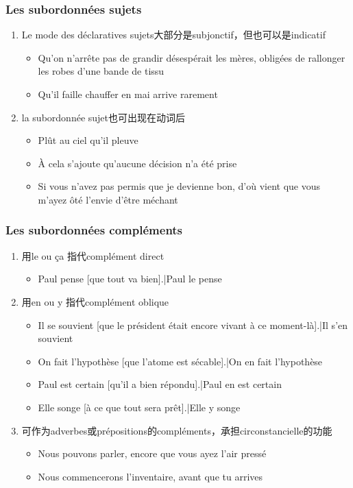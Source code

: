 \documentclass[UTF8]{report}
\begin{document}
\subsubsection{Les subordonnées sujets}
\begin{enumerate}
    \item Le mode des déclaratives sujets大部分是subjonctif，但也可以是indicatif
    \begin{itemize}
        \item Qu’on n’arrête pas de grandir désespérait les mères, obligées de rallonger les robes d’une bande de tissu
        \item Qu’il faille chauffer en mai arrive rarement
    \end{itemize}
    \item la subordonnée sujet也可出现在动词后
    \begin{itemize}
        \item Plût au ciel qu’il pleuve
        \item À cela s’ajoute qu’aucune décision n’a été prise
        \item Si vous n’avez pas permis que je devienne bon, d’où vient que vous m’ayez ôté l’envie d’être méchant
    \end{itemize}
\end{enumerate}

\subsubsection{Les subordonnées compléments}
\begin{enumerate}
    \item 用le ou ça 指代complément direct
    \begin{itemize}
        \item Paul pense [que tout va bien].|Paul le pense
    \end{itemize}
    \item 用en ou y 指代complément oblique
    \begin{itemize}
        \item Il se souvient [que le président était encore vivant à ce moment-là].|Il s’en souvient
        \item On fait l’hypothèse [que l’atome est sécable].|On en fait l’hypothèse
        \item Paul est certain [qu’il a bien répondu].|Paul en est certain
        \item Elle songe [à ce que tout sera prêt].|Elle y songe
    \end{itemize}
    \item 可作为adverbes或prépositions的compléments，承担circonstancielle的功能
    \begin{itemize}
        \item Nous pouvons parler, encore que vous ayez l’air pressé
        \item Nous commencerons l’inventaire, avant que tu arrives
    \end{itemize}
\end{enumerate}
\end{document}
